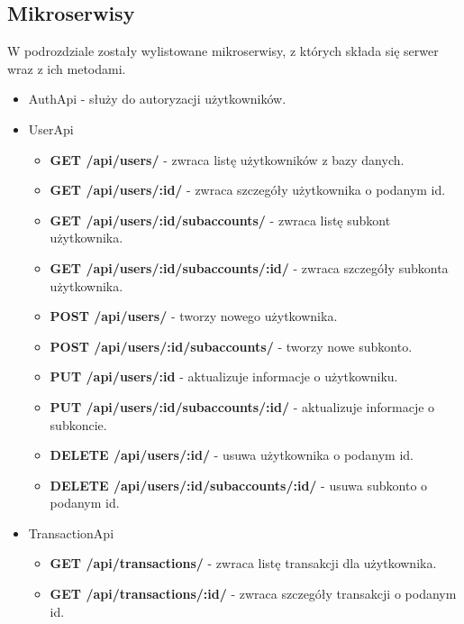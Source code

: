 \documentclass{article}
\begin{document}
	\subsection{Mikroserwisy}
	W podrozdziale zostały wylistowane mikroserwisy, z których składa się serwer wraz z ich 
	metodami.
	\begin{itemize}
		\item AuthApi - służy do autoryzacji użytkowników.
		\item UserApi
			\begin{itemize}
				\item \textbf{GET /api/users/} - zwraca listę użytkowników z bazy danych.
				
				\item \textbf{GET /api/users/:id/} - zwraca szczegóły użytkownika o podanym id.
				
				\item \textbf{GET /api/users/:id/subaccounts/} - zwraca listę subkont użytkownika.
				
				\item \textbf{GET /api/users/:id/subaccounts/:id/} - zwraca szczegóły subkonta użytkownika.
				
				\item \textbf{POST /api/users/} - tworzy nowego użytkownika.
				
				\item \textbf{POST /api/users/:id/subaccounts/} - tworzy nowe subkonto.
				
				\item \textbf{PUT /api/users/:id} - aktualizuje informacje o użytkowniku.
				
				\item \textbf{PUT /api/users/:id/subaccounts/:id/} - aktualizuje informacje o subkoncie.
				
				\item \textbf{DELETE /api/users/:id/} - usuwa użytkownika o podanym id.
				
				\item \textbf{DELETE /api/users/:id/subaccounts/:id/} - usuwa subkonto o podanym id.
			\end{itemize}
		\item TransactionApi
			\begin{itemize}
				\item \textbf{GET /api/transactions/} - zwraca listę transakcji dla użytkownika.
				
				\item \textbf{GET /api/transactions/:id/} - zwraca szczegóły transakcji o podanym id.
				

\end{itemize}
\end{itemize}
\end{document}
